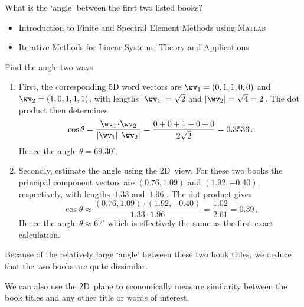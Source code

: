 \begin{example} \label{eg:}
What is the `angle' between the first two listed books?
\begin{itemize}
\item Introduction to Finite and Spectral Element Methods using \textsc{Matlab}
\item Iterative Methods for Linear Systems: Theory and Applications 
\end{itemize}
\begin{solution} 
Find the angle two ways.
\begin{enumerate}
\item First, the corresponding 5D word vectors are \(\wv_1=(0,1,1,0,0)\) and \(\wv_2=(1,0,1,1,1)\), with lengths \(|\wv_1|=\sqrt2\) and \(|\wv_2|=\sqrt4=2\)\,.
The dot product then determines
\begin{equation*}
\cos\theta=\frac{\wv_1\cdot\wv_2}{|\wv_1|\,|\wv_2|}
=\frac{0+0+1+0+0}{2\sqrt2} =0.3536\,.
\end{equation*}
Hence the angle \(\theta=69.30^\circ\).
\item Secondly, estimate the angle using the 2D~view.
For these two books the principal component vectors are \((0.76,1.09)\) and \((1.92,-0.40)\), respectively, with lengths~\(1.33\) and~\(1.96\) \twodp.
The dot product gives
\begin{equation*}
\cos\theta\approx \frac{(0.76,1.09)\cdot(1.92,-0.40)}{1.33\cdot 1.96}
= \frac{1.02}{2.61}=0.39\,.
\end{equation*}
Hence the angle \(\theta\approx67^\circ\) which is effectively the same as the first exact calculation.
\end{enumerate}
Because of the relatively large `angle' between these two book titles, we deduce that the two books are quite dissimilar.
\end{solution}
\end{example}

We can also use the 2D~plane to economically measure similarity between the book titles and any other title or words of interest.


